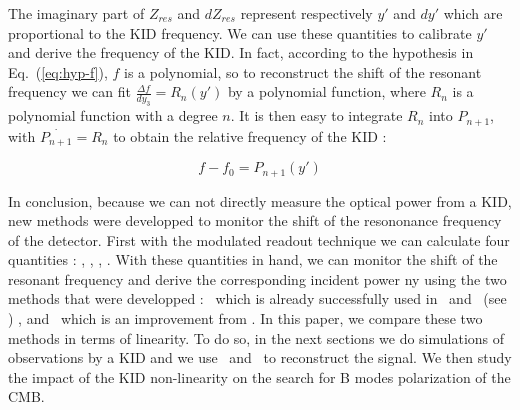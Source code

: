The imaginary part of $Z_{res}$ and $dZ_{res}$ represent respectively $y'$ and $dy'$ which are proportional to the KID frequency. We can use these quantities to calibrate $y'$ and derive the frequency of the KID. In fact, according to the hypothesis in Eq.~(\ref{eq:hyp-f}), $f$ is a polynomial, so to reconstruct the shift of the resonant frequency we can fit $\frac{\Delta f}{dy_{3}} = R_{n}(y')$ by a polynomial function, where $R_{n}$ is a polynomial function with a degree $n$. It is then easy to integrate $R_{n}$ into $P_{n+1}$, with $\overset{.}{P_{n+1}}=R_{n}$  to obtain the relative frequency of the KID : 

\begin{equation}
f - f_{0} = P_{n+1}(y')
\end{equation}

In conclusion, because we can not directly measure the optical power from a KID, new methods were developped to monitor the shift of the resononance frequency of the detector. First with the modulated readout technique we can calculate four quantities : \I, \Q, \di, \dq. With these quantities in hand, we can monitor the shift of the resonant frequency and derive the corresponding incident power ny using the two methods that were developped : \rf\ which is already successfully used in \nika\ and \ (see \citep{2014A&A...569A...9C}) , and \cf\ which is an improvement from \rf . In this paper, we compare these two methods in terms of linearity. To do so, in the next sections we do simulations of observations by a KID and we use \rf\ and \cf\ to reconstruct the signal. We then study the impact of the KID non-linearity on the search for B modes polarization of the CMB.